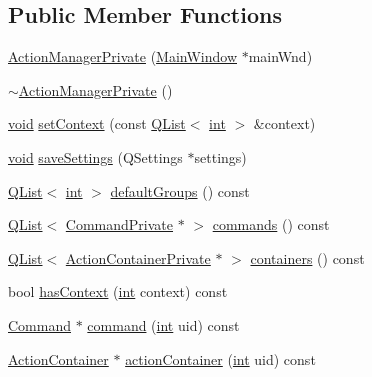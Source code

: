 \subsection*{Public Member Functions}
\begin{DoxyCompactItemize}
\item 
\hyperlink{group___core_plugin_ga12aef0a3b78b0e37f3db4a05e4e89615}{Action\-Manager\-Private} (\hyperlink{class_core_1_1_internal_1_1_main_window}{Main\-Window} $\ast$main\-Wnd)
\item 
\hyperlink{group___core_plugin_ga05b7f5a2c3f9b034d08ac45e5096a854}{$\sim$\-Action\-Manager\-Private} ()
\item 
\hyperlink{group___u_a_v_objects_plugin_ga444cf2ff3f0ecbe028adce838d373f5c}{void} \hyperlink{group___core_plugin_gaf1c3a6da903b910e7bf3b042d75f4f6d}{set\-Context} (const \hyperlink{class_q_list}{Q\-List}$<$ \hyperlink{ioapi_8h_a787fa3cf048117ba7123753c1e74fcd6}{int} $>$ \&context)
\item 
\hyperlink{group___u_a_v_objects_plugin_ga444cf2ff3f0ecbe028adce838d373f5c}{void} \hyperlink{group___core_plugin_ga14b0ae1450cbbeb3a20d57f42414cb40}{save\-Settings} (Q\-Settings $\ast$settings)
\item 
\hyperlink{class_q_list}{Q\-List}$<$ \hyperlink{ioapi_8h_a787fa3cf048117ba7123753c1e74fcd6}{int} $>$ \hyperlink{group___core_plugin_ga83364e44abe77408ac169e851f7d998f}{default\-Groups} () const 
\item 
\hyperlink{class_q_list}{Q\-List}$<$ \hyperlink{class_core_1_1_internal_1_1_command_private}{Command\-Private} $\ast$ $>$ \hyperlink{group___core_plugin_ga91b9907f02df212989f82a7af1d544e9}{commands} () const 
\item 
\hyperlink{class_q_list}{Q\-List}$<$ \hyperlink{class_core_1_1_internal_1_1_action_container_private}{Action\-Container\-Private} $\ast$ $>$ \hyperlink{group___core_plugin_ga984362f3bdf006ac121c1e3e7a10f49e}{containers} () const 
\item 
bool \hyperlink{group___core_plugin_ga6b861e343876351edf5d2fae24a5f0cb}{has\-Context} (\hyperlink{ioapi_8h_a787fa3cf048117ba7123753c1e74fcd6}{int} context) const 
\item 
\hyperlink{class_core_1_1_command}{Command} $\ast$ \hyperlink{group___core_plugin_ga5a55bb1c0b2a8c78afc2ba6dbaf2427d}{command} (\hyperlink{ioapi_8h_a787fa3cf048117ba7123753c1e74fcd6}{int} uid) const 
\item 
\hyperlink{class_core_1_1_action_container}{Action\-Container} $\ast$ \hyperlink{group___core_plugin_ga3ec130bab28be18162ff49816e062c07}{action\-Container} (\hyperlink{ioapi_8h_a787fa3cf048117ba7123753c1e74fcd6}{int} uid) const 

\end{DoxyCompactItemize}
